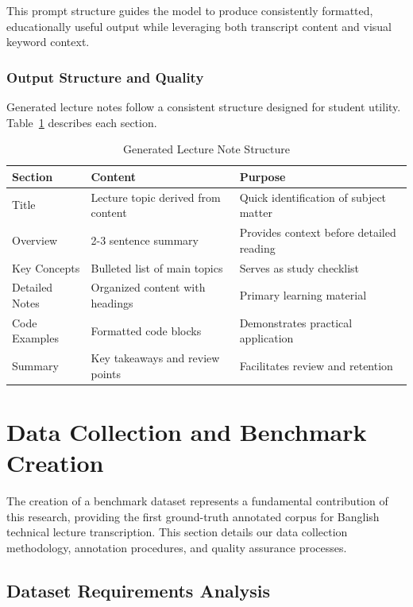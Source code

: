 This prompt structure guides the model to produce consistently formatted, educationally useful output while leveraging both transcript content and visual keyword context.

\subsubsection{Output Structure and Quality}

Generated lecture notes follow a consistent structure designed for student utility. Table~\ref{tab:note_structure} describes each section.

\begin{table}[h]
\centering
\caption{Generated Lecture Note Structure}
\label{tab:note_structure}
\begin{tabular}{|l|p{5cm}|p{5.5cm}|}
\hline
\textbf{Section} & \textbf{Content} & \textbf{Purpose} \\
\hline
Title & Lecture topic derived from content & Quick identification of subject matter \\
\hline
Overview & 2-3 sentence summary & Provides context before detailed reading \\
\hline
Key Concepts & Bulleted list of main topics & Serves as study checklist \\
\hline
Detailed Notes & Organized content with headings & Primary learning material \\
\hline
Code Examples & Formatted code blocks & Demonstrates practical application \\
\hline
Summary & Key takeaways and review points & Facilitates review and retention \\
\hline
\end{tabular}
\end{table}

\section{Data Collection and Benchmark Creation}

The creation of a benchmark dataset represents a fundamental contribution of this research, providing the first ground-truth annotated corpus for Banglish technical lecture transcription. This section details our data collection methodology, annotation procedures, and quality assurance processes.

\subsection{Dataset Requirements Analysis}

